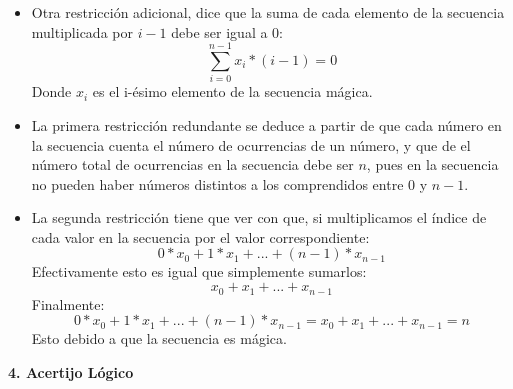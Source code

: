 \documentclass[12pt]{article}
\begin{document}
\begin{itemize}
\begin{itemize}
\item Otra restricción adicional, dice que la suma de cada elemento de la secuencia multiplicada por $i-1$ debe ser igual a 0:
\begin{equation*}
\sum_{i=0}^{n-1} x_{i}*(i-1) = 0
\end{equation*}
Donde $x_{i}$ es el i-ésimo elemento de la secuencia mágica.
\end{itemize}
\begin{itemize}
\item La primera restricción redundante se deduce a partir de que cada número en la secuencia cuenta el número de ocurrencias de un número, y que de el número total de ocurrencias en la secuencia debe ser $n$, pues en la secuencia no pueden haber números distintos a los comprendidos entre $0$ y $n-1$. 
\item La segunda restricción tiene que ver con que, si multiplicamos el índice de cada valor en la secuencia por el valor correspondiente:
\begin{equation*}
0 * x_{0} + 1 * x_{1} + ... + (n-1) * x_{n-1}
\end{equation*}
Efectivamente esto es igual que simplemente sumarlos:
\begin{equation*}
x_{0} + x_{1} + ... + x_{n-1}
\end{equation*}
Finalmente:
\begin{equation*}
0 * x_{0} + 1 * x_{1} + ... + (n-1) * x_{n-1} = x_{0} + x_{1} + ... + x_{n-1} = n
\end{equation*}
Esto debido a que la secuencia es mágica. 
\end{itemize}
\end{itemize}

\newpage

\begin{flushleft}
\textbf{4. Acertijo Lógico}
\end{flushleft}
\end{document}
